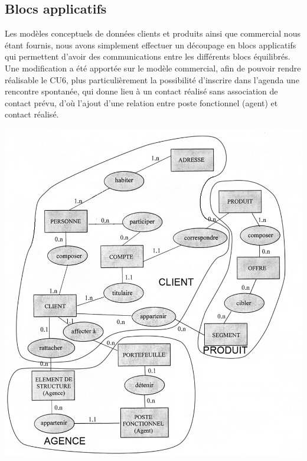 \subsection{Blocs applicatifs}
Les modèles conceptuels de données clients et produits ainsi que commercial nous étant fournis, nous avons simplement effectuer un découpage en blocs applicatifs qui permettent d'avoir des communications entre les différents blocs équilibrés.
Une modification a été apportée sur le modèle commercial, afin de pouvoir rendre réalisable le CU6, plus particulièrement la possibilité d'inscrire dans l'agenda une rencontre spontanée, qui donne lieu à un contact réalisé sans association de contact prévu, d'où l'ajout d'une relation entre poste fonctionnel (agent) et contact réalisé.
\begin {center}
\includegraphics[width=\textwidth]{Decoupage MCD 1.png}

\end{center}
